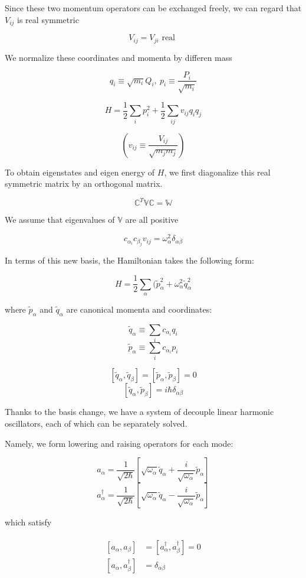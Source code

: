 ﻿\documentclass[twoside]{book}
\numberwithin{equation}{section}
\begin{document}
Since these two momentum operators can be exchanged freely, we can regard that $V_{ij}$ is real symmetric

\[V_{ij} = V_{ji}\text{ real } \]

We normalize these coordinates and momenta by differen mass

\[q_i \equiv\sqrt{m_i}Q_i,\ p_i \equiv \frac{P_i}{\sqrt{m_i}} \]

\[H = \frac{1}{2}\sum_{i}p_i^2+\frac{1}{2}\sum_{ij}v_{ij}q_iq_j \]

\[(v_{ij} \equiv \frac{V_{ij}}{\sqrt{m_jm_j}} )\]

To obtain eigenstates and eigen energy of $H$, we first diagonalize this real symmetric matrix by an orthogonal matrix. 

\[\mathbb{C}^T \mathbb{V}\mathbb{C} = \mathbb{W} \]

We assume that eigenvalues of $\mathbb{V}$ are all positive

\[c_{\alpha_i}c_{\beta_j}v_{ij} = \omega_{\alpha}^2\delta_{\alpha\beta} \]

In terms of this new basis, the Hamiltonian takes the following form:

\[H = \frac{1}{2}\sum_{\alpha}(\tilde{p}_{\alpha}^2+\omega_{\alpha}^2\tilde{q}_{\alpha}^2 \]

where $\tilde{p}_{\alpha}$ and $\tilde{q}_{\alpha}$ are canonical momenta and coordinates:

\[\tilde{q}_{\alpha}\equiv \sum_i c_{\alpha_i}q_i \]
\[\tilde{p}_{\alpha}\equiv \sum_i c_{\alpha_i}p_i \]

\[[\tilde{q}_{\alpha},\tilde{q}_{\beta}] = [\tilde{p}_{\alpha},\tilde{p}_{\beta}] = 0 \]
\[[\tilde{q}_{\alpha},\tilde{p}_{\beta}] = i\hbar\delta_{\alpha\beta} \]

Thanks to the basis change, we have a system of decouple linear harmonic oscillators, each of which can be separately solved. 

Namely, we form lowering and raising operators for each mode:

\[a_{\alpha} = \frac{1}{\sqrt{2\hbar}}\left[\sqrt{\omega_{\alpha}}\tilde{q}_{\alpha}+\frac{i}{\sqrt{\omega_{\alpha}}}\tilde{p}_{\alpha}\right] \]
\[a_{\alpha}^\dagger = \frac{1}{\sqrt{2\hbar}}\left[\sqrt{\omega_{\alpha}}\tilde{q}_{\alpha}-\frac{i}{\sqrt{\omega_{\alpha}}}\tilde{p}_{\alpha}\right] \]

which satisfy

\begin{align}\label{Eqs1.3.2}
\begin{split}
[a_{\alpha},a_{\beta}] & = [a_\alpha^\dagger, a_\beta^\dagger] = 0\\
[a_\alpha,a_\beta^\dagger] &= \delta_{\alpha\beta}
\end{split}
\end{align}
\end{document}
